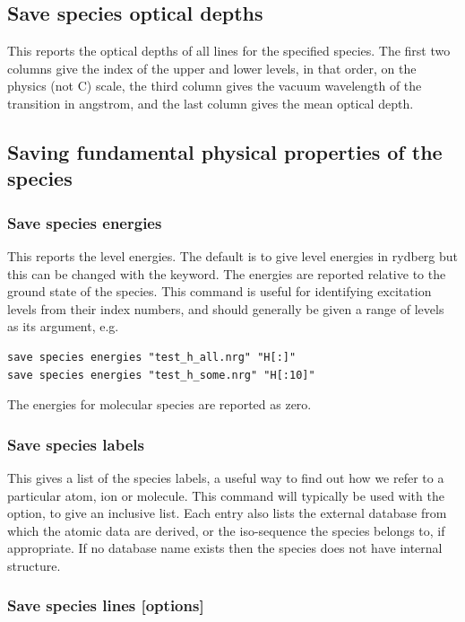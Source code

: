 \subsection{Save species optical depths}
\label{sec:SaveSpeciesOpticalDepths}
This reports the optical depths of all lines for the specified species.
The first two columns give the index of the upper and lower levels, in
that order, on the physics (not C) scale, the third column gives the
vacuum wavelength of the transition in angstrom, and the last column gives
the mean optical depth.


\subsection{Saving fundamental physical properties of the species}

\subsubsection{Save species energies}
This reports the level energies.  The default is to give level
energies in rydberg but this can be changed with the
 keyword.  The energies are reported relative to the
ground state of the species.  This command is useful for identifying
excitation levels from their index numbers, and should generally be
given a range of levels as its argument, e.g.
\begin{verbatim}
save species energies "test_h_all.nrg" "H[:]"
save species energies "test_h_some.nrg" "H[:10]"
\end{verbatim}
The energies for molecular species are reported as zero.

\subsubsection{Save species labels}
\label{sec:SaveSpeciesLabels}
This gives a list of the species labels, a useful way to find out how
we refer to a particular atom, ion or molecule.  This command will
typically be used with the  option, to give an
inclusive list.
Each entry also lists the external database from which the atomic
data are derived, or the iso-sequence the species belongs to, if
appropriate.
If no database name exists then the species does not have internal structure.

\subsubsection{Save species lines [options]}
\label{sec:CommandSaveSpeciesLines}

